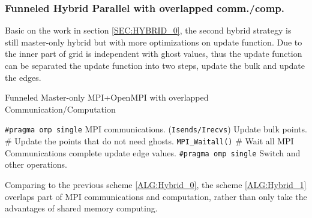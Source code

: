 \subsubsection{Funneled Hybrid Parallel with overlapped comm./comp.}\label{SEC:HYBRID_1}
Basic on the work in section \ref{SEC:HYBRID_0}, the second hybrid strategy is still master-only hybrid but with more optimizations on update 
function. 
Due to the inner part of grid is independent with ghost values, thus the update function can be separated the update function into two steps, 
update the bulk and update the edges.

\begin{algorithm}
  \caption{Funneled Master-only MPI+OpenMPI with overlapped Communication/Computation}
  \label{ALG:Hybrid_1}
  \begin{algorithmic}[1]
      \STATE \texttt{\#pragma omp single}
      \STATE MPI communications. (\texttt{Isends/Irecvs})
        \STATE Update bulk points.                                  \hfill \# Update the points that do not need ghosts.
      \ENDFOR
      \STATE \texttt{MPI\_Waitall()}                                \hfill \# Wait all MPI Communications complete
        \STATE update edge values.                                 
      \ENDFOR
      \STATE \texttt{\#pragma omp single} Switch and other operations.
    \ENDFOR
  \end{algorithmic}
\end{algorithm}
Comparing to the previous scheme \ref{ALG:Hybrid_0}, the scheme \ref{ALG:Hybrid_1} overlaps part of MPI communications and computation, 
rather than only take the advantages of shared memory computing.

